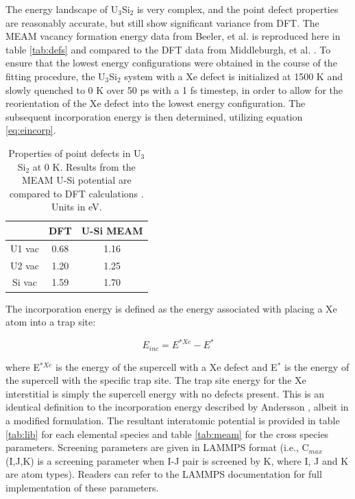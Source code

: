 \documentclass[review]{elsarticle}
\begin{document}
The energy landscape of U$_3$Si$_2$ is very complex, and the point defect properties are reasonably accurate, but still show significant variance from DFT. The MEAM vacancy formation energy data from Beeler, et al. \cite{beelerusi} is reproduced here in table \ref{tab:defs} and compared to the DFT data from Middleburgh, et al. \cite{middleburgh2016}. To ensure that the lowest energy configurations were obtained in the course of the fitting procedure, the U$_3$Si$_2$ system with a Xe defect is initialized at 1500 K and slowly quenched to 0 K over 50 ps with a 1 fs timestep, in order to allow for the reorientation of the Xe defect into the lowest energy configuration. The subsequent incorporation energy is then determined, utilizing equation \ref{eq:eincorp}. 

\begin{table}[h!]
\caption{Properties of point defects in U$_{3}$Si$_{2}$ at 0 K. Results from the MEAM U-Si potential are compared to DFT calculations \cite{middleburgh2016}. Units in eV.}\label{tab:defs}
\begin{center}
\begin{tabular}{|c|c|c|}
 \hline
 & DFT & U-Si MEAM \\
 \hline
 U1 vac & 0.68 & 1.16 \\
 U2 vac & 1.20 & 1.25 \\
 Si vac & 1.59 & 1.70 \\
 \hline
\end{tabular}
\end{center}
\label{default}
\end{table}%

The incorporation energy is defined as the energy associated with placing a Xe atom into a trap site:

\begin{equation}
\label{eq:eincorp}
E_{inc} = E^{*Xe} - E^*
\end{equation}

where E$^{*Xe}$ is the energy of the supercell with a Xe defect and E$^*$ is the energy of the supercell with the specific trap site. The trap site energy for the Xe interstitial is simply the supercell energy with no defects present. This is an identical definition to the incorporation energy described by Andersson \cite{andersson2018}, albeit in a modified formulation. The resultant interatomic potential is provided in table \ref{tab:lib} for each elemental species and table \ref{tab:meam} for the cross species parameters. Screening parameters are given in LAMMPS format (i.e., C$_{max}$(I,J,K) is a screening parameter when I-J pair is screened by K, where I, J and K are atom types). Readers can refer to the LAMMPS \cite{plimpton1995} documentation for full implementation of these parameters. 
\end{document}
